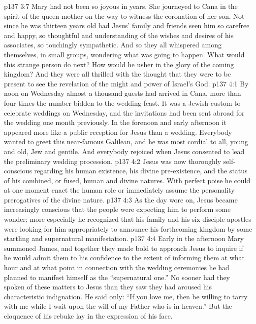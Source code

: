 \vs p137 3:7 Mary had not been so joyous in years. She journeyed to Cana in the spirit of the queen mother on the way to witness the coronation of her son. Not since he was thirteen years old had Jesus’ family and friends seen him so carefree and happy, so thoughtful and understanding of the wishes and desires of his associates, so touchingly sympathetic. And so they all whispered among themselves, in small groups, wondering what was going to happen. What would this strange person do next? How would he usher in the glory of the coming kingdom? And they were all thrilled with the thought that they were to be present to see the revelation of the might and power of Israel’s God.\plusone
{}
\vs p137 4:1 By noon on Wednesday almost a thousand guests had arrived in Cana, more than four times the number bidden to the wedding feast. It was a Jewish custom to celebrate weddings on Wednesday, and the invitations had been sent abroad for the wedding one month previously. In the forenoon and early afternoon it appeared more like a public reception for Jesus than a wedding. Everybody wanted to greet this near\hyp{}famous Galilean, and he was most cordial to all, young and old, Jew and gentile. And everybody rejoiced when Jesus consented to lead the preliminary wedding procession.
\vs p137 4:2 Jesus was now thoroughly self\hyp{}conscious regarding his human existence, his divine pre\hyp{}existence, and the status of his combined, or fused, human and divine natures. With perfect poise he could at one moment enact the human role or immediately assume the personality prerogatives of the divine nature.
\vs p137 4:3 As the day wore on, Jesus became increasingly conscious that the people were expecting him to perform some wonder; more especially he recognized that his family and his six disciple\hyp{}apostles were looking for him appropriately to announce his forthcoming kingdom by some startling and supernatural manifestation.
\vs p137 4:4 Early in the afternoon Mary summoned James, and together they made bold to approach Jesus to inquire if he would admit them to his confidence to the extent of informing them at what hour and at what point in connection with the wedding ceremonies he had planned to manifest himself as the “supernatural one.” No sooner had they spoken of these matters to Jesus than they saw they had aroused his characteristic indignation. He said only: \textcolor{ubdarkred}{“If you love me, then be willing to tarry with me while I wait upon the will of my Father who is in heaven.”} But the eloquence of his rebuke lay in the expression of his face.
